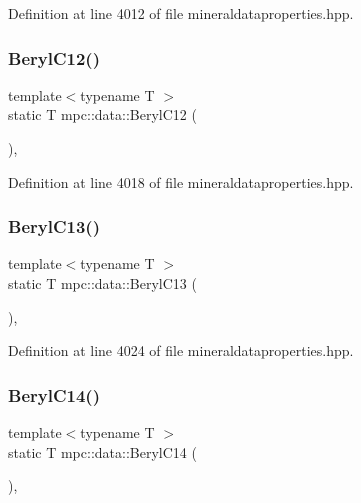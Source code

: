 Definition at line 4012 of file mineraldataproperties.\+hpp.

\mbox{\label{namespacempc_1_1data_a5252822737b5c18f3e4747c30a30cc2e}} 
\subsubsection{\texorpdfstring{Beryl\+C12()}{BerylC12()}}
{\footnotesize\ttfamily template$<$typename T $>$ \\
static T mpc\+::data\+::\+Beryl\+C12 (\begin{DoxyParamCaption}{ }\end{DoxyParamCaption})\hspace{0.3cm}{\ttfamily [inline]}, {\ttfamily [static]}}



Definition at line 4018 of file mineraldataproperties.\+hpp.

\mbox{\label{namespacempc_1_1data_ae1450834806a9b5518b5a389429f78f9}} 
\subsubsection{\texorpdfstring{Beryl\+C13()}{BerylC13()}}
{\footnotesize\ttfamily template$<$typename T $>$ \\
static T mpc\+::data\+::\+Beryl\+C13 (\begin{DoxyParamCaption}{ }\end{DoxyParamCaption})\hspace{0.3cm}{\ttfamily [inline]}, {\ttfamily [static]}}



Definition at line 4024 of file mineraldataproperties.\+hpp.

\mbox{\label{namespacempc_1_1data_a80b470aa4edb25d55e84e9e8f6f412d3}} 
\subsubsection{\texorpdfstring{Beryl\+C14()}{BerylC14()}}
{\footnotesize\ttfamily template$<$typename T $>$ \\
static T mpc\+::data\+::\+Beryl\+C14 (\begin{DoxyParamCaption}{ }\end{DoxyParamCaption})\hspace{0.3cm}{\ttfamily [inline]}, {\ttfamily [static]}}



